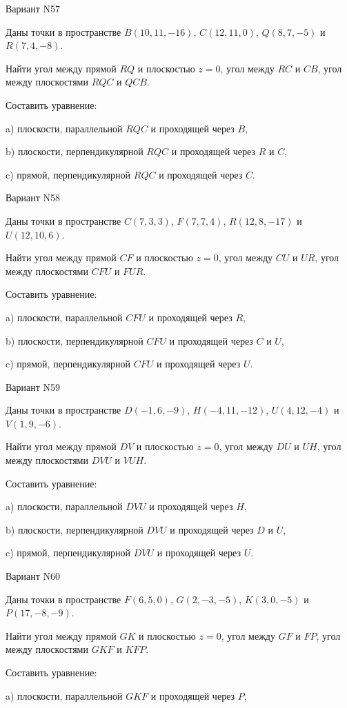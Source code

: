 \documentclass[11pt]{report}
\begin{document}
Вариант N57

Даны точки в пространстве
$B(10, 11, -16)$, $C(12, 11, 0)$, $Q(8, 7, -5)$ и
$R(7, 4, -8)$.

Найти угол между прямой $RQ$ и плоскостью $z = 0$, угол между $RC$ и $CB$, угол между плоскостями $RQC$ 
и $QCB$.

Составить уравнение: 

a) плоскости, параллельной $RQC$ и проходящей через $B$,

b) плоскости, перпендикулярной $RQC$ и проходящей через $R$ и $C$,

c) прямой, перпендикулярной $RQC$ и проходящей через $C$.

Вариант N58

Даны точки в пространстве
$C(7, 3, 3)$, $F(7, 7, 4)$, $R(12, 8, -17)$ и
$U(12, 10, 6)$.

Найти угол между прямой $CF$ и плоскостью $z = 0$, угол между $CU$ и $UR$, угол между плоскостями $CFU$ 
и $FUR$.

Составить уравнение: 

a) плоскости, параллельной $CFU$ и проходящей через $R$,

b) плоскости, перпендикулярной $CFU$ и проходящей через $C$ и $U$,

c) прямой, перпендикулярной $CFU$ и проходящей через $U$.

Вариант N59

Даны точки в пространстве
$D(-1, 6, -9)$, $H(-4, 11, -12)$, $U(4, 12, -4)$ и
$V(1, 9, -6)$.

Найти угол между прямой $DV$ и плоскостью $z = 0$, угол между $DU$ и $UH$, угол между плоскостями $DVU$ 
и $VUH$.

Составить уравнение: 

a) плоскости, параллельной $DVU$ и проходящей через $H$,

b) плоскости, перпендикулярной $DVU$ и проходящей через $D$ и $U$,

c) прямой, перпендикулярной $DVU$ и проходящей через $U$.

Вариант N60

Даны точки в пространстве
$F(6, 5, 0)$, $G(2, -3, -5)$, $K(3, 0, -5)$ и
$P(17, -8, -9)$.

Найти угол между прямой $GK$ и плоскостью $z = 0$, угол между $GF$ и $FP$, угол между плоскостями $GKF$ 
и $KFP$.

Составить уравнение: 

a) плоскости, параллельной $GKF$ и проходящей через $P$,
\end{document}
